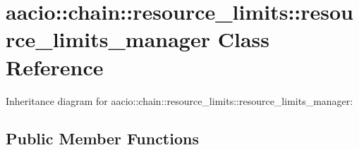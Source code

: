 \hypertarget{classaacio_1_1chain_1_1resource__limits_1_1resource__limits__manager}{}\section{aacio\+:\+:chain\+:\+:resource\+\_\+limits\+:\+:resource\+\_\+limits\+\_\+manager Class Reference}
\label{classaacio_1_1chain_1_1resource__limits_1_1resource__limits__manager}


Inheritance diagram for aacio\+:\+:chain\+:\+:resource\+\_\+limits\+:\+:resource\+\_\+limits\+\_\+manager\+:
\subsection*{Public Member Functions}
